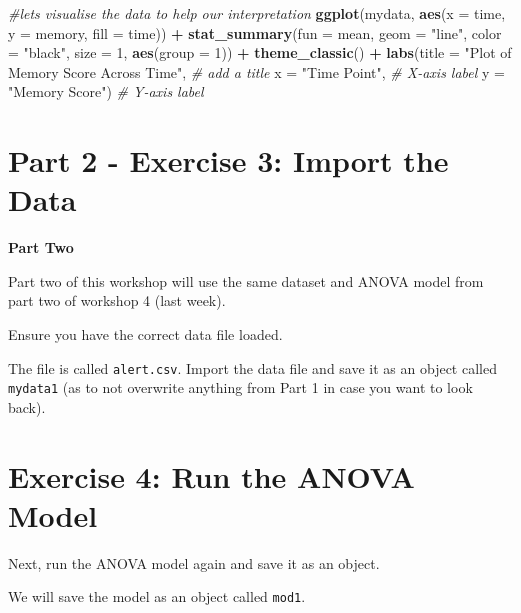 \documentclass[
]{book}
\newenvironment{Shaded}{\begin{snugshade}}{\end{snugshade}}
\newcommand{\AttributeTok}[1]{\textcolor[rgb]{0.13,0.29,0.53}{#1}}
\newcommand{\CommentTok}[1]{\textcolor[rgb]{0.56,0.35,0.01}{\textit{#1}}}
\newcommand{\DecValTok}[1]{\textcolor[rgb]{0.00,0.00,0.81}{#1}}
\newcommand{\FunctionTok}[1]{\textcolor[rgb]{0.13,0.29,0.53}{\textbf{#1}}}
\newcommand{\NormalTok}[1]{#1}
\newcommand{\SpecialCharTok}[1]{\textcolor[rgb]{0.81,0.36,0.00}{\textbf{#1}}}
\newcommand{\StringTok}[1]{\textcolor[rgb]{0.31,0.60,0.02}{#1}}
\let\oldsection\section
\renewcommand{\section}{\needspace{5\baselineskip}\oldsection}
\begin{document}
\begin{Shaded}
\begin{Highlighting}[]
\CommentTok{\#let\textquotesingle{}s visualise the data to help our interpretation}
\FunctionTok{ggplot}\NormalTok{(mydata, }\FunctionTok{aes}\NormalTok{(}\AttributeTok{x =}\NormalTok{ time, }\AttributeTok{y =}\NormalTok{ memory, }\AttributeTok{fill =}\NormalTok{ time)) }\SpecialCharTok{+}
  \FunctionTok{stat\_summary}\NormalTok{(}\AttributeTok{fun =}\NormalTok{ mean, }\AttributeTok{geom =} \StringTok{"line"}\NormalTok{, }\AttributeTok{color =} \StringTok{"black"}\NormalTok{, }\AttributeTok{size =} \DecValTok{1}\NormalTok{, }\FunctionTok{aes}\NormalTok{(}\AttributeTok{group =} \DecValTok{1}\NormalTok{)) }\SpecialCharTok{+} 
  \FunctionTok{theme\_classic}\NormalTok{() }\SpecialCharTok{+}
  \FunctionTok{labs}\NormalTok{(}\AttributeTok{title =} \StringTok{"Plot of Memory Score Across Time"}\NormalTok{,  }\CommentTok{\# add a title}
       \AttributeTok{x =} \StringTok{"Time Point"}\NormalTok{,  }\CommentTok{\# X{-}axis label}
       \AttributeTok{y =} \StringTok{"Memory Score"}\NormalTok{)  }\CommentTok{\# Y{-}axis label}
\end{Highlighting}
\end{Shaded}

\section{Part 2 - Exercise 3: Import the Data}\label{part-2---exercise-3-import-the-data}

\textbf{Part Two}

Part two of this workshop will use the same dataset and ANOVA model from part two of workshop 4 (last week).

Ensure you have the correct data file loaded.

The file is called \texttt{alert.csv}. Import the data file and save it as an object called \texttt{mydata1} (as to not overwrite anything from Part 1 in case you want to look back).

\section{Exercise 4: Run the ANOVA Model}\label{exercise-4-run-the-anova-model}

Next, run the ANOVA model again and save it as an object.

We will save the model as an object called \texttt{mod1}.
\end{document}
